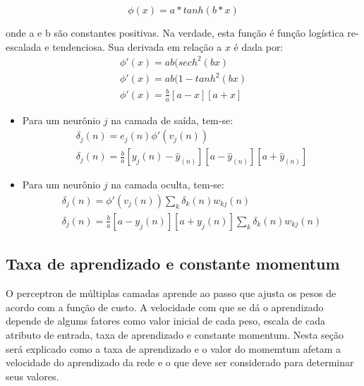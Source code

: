 \begin{enumerate}
\begin{equation}
    \phi(x)=a*tanh(b*x)
\end{equation}

onde a e b são constantes positivas. Na verdade, esta função é função logística re-escalada e tendenciosa.
Sua derivada em relação a $x$ é dada por:
\begin{equation}
    \begin{split}
    \phi'(x)=ab(sech^2(bx) \\
    \phi'(x)=ab(1-tanh^2(bx) \\
    \phi'(x)=\frac{b}{a}[a-x][a+x]
    \end{split}
\end{equation}
\begin{itemize}
    \item Para um neurônio $j$ na camada de saída, tem-se:
        \begin{equation}
            \begin{split}
                \delta_j(n)=e_j(n)\phi'(v_j(n)) \\
                \delta_j(n)=\frac{b}{a}[y_j(n)-\hat{y}_(n)][a-\hat{y}_(n)][a+\hat{y}_(n)]
            \end{split}
        \end{equation}
    \item Para um neurônio $j$ na camada oculta, tem-se:
    \begin{equation}
        \begin{split}
        \delta_j(n) = \phi'(v_j(n)) \sum_k \delta_k(n)w_{kj}(n) \\
        \delta_j(n) = \frac{b}{a}[a-y_j(n)][a+y_j(n)] \sum_k \delta_k(n)w_{kj}(n)
        \end{split}
    \end{equation}
\end{itemize}
\end{enumerate}

\subsection{Taxa de aprendizado e constante momentum}

O perceptron de múltiplas camadas aprende ao passo que ajusta os pesos de acordo com a função de custo. A velocidade com que se dá o aprendizado depende de algums fatores como valor inicial de cada peso, escala de cada atributo de entrada, taxa de aprendizado e constante momentum. Nesta seção será explicado como a taxa de aprendizado e o valor do momemtum afetam a velocidade do aprendizado da rede e o que deve ser considerado para determinar seus valores.


